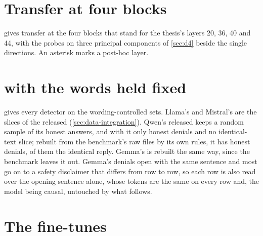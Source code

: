 \section*{Transfer at four blocks}

 gives transfer at the four blocks that stand for the thesis's layers 20, 36, 40 and
44, with the probes on three principal components of \cref{sec:d4} beside the single directions. An
asterisk marks a post-hoc layer.

\begin{table}[htbp]
\centering
\footnotesize
\setlength{\tabcolsep}{3pt}
\caption{Mean off-diagonal AUROC of the train-one-test-all matrix at the four named blocks of each model.}
\label{tab:xm-transfer}
\fittable{}
\end{table}

\section*{\hpkr{} with the words held fixed}

 gives every detector on the wording-controlled sets. Llama's and Mistral's are the
slices of the released \hpkr{} (\cref{sec:data-integration}). Qwen's released \hpkr{} keeps a random sample
of its honest answers, and with it only  honest denials and no identical-text slice;
rebuilt from the benchmark's raw files by its own rules, it has  honest denials,
 of them the identical reply. Gemma's \hpkr{} is rebuilt the same way, since the
benchmark leaves it out. Gemma's denials open with the same sentence and most go on to a safety disclaimer
that differs from row to row, so each row is also read over the opening sentence alone, whose tokens are the
same on every row and, the model being causal, untouched by what follows.

\begin{table}[htbp]
\centering
\footnotesize
\setlength{\tabcolsep}{3.5pt}
\caption[AUROC on \hpkr's wording-controlled sets.]{AUROC on \hpkr's wording-controlled sets: the base probe D2 trained at the same block, the three
contrasts, K and D9 + K, and the random band.}
\label{tab:xm-wording}
\fittable{}
\end{table}

\section*{The fine-tunes}


